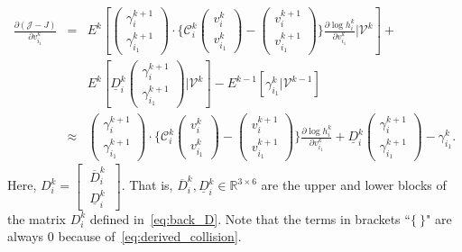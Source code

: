 \documentclass[12pt,nopreprintline]{elsarticle}
\newcommand{\cC}{\mathcal C} \newcommand{\cD}{\mathcal D}
\begin{document}
\begin{eqnarray}
\frac{\partial (\mathcal{J}-J)}{\partial v^k_{i_1}}
&=& E^k\left[ \begin{pmatrix} \gamma_i^{k+1} \\ \gamma_{i_1}^{k+1} \end{pmatrix}  \cdot
\bigg\{  \cC_i^k  \begin{pmatrix}
v_i^{k} \\ v_{i_1}^{k}
\end{pmatrix}  - \begin{pmatrix}
v_i^{k+1} \\ v_{i_1}^{k+1}
\end{pmatrix}  \bigg\} 
   \frac{\partial \log h_i^k}{\partial v_{i_1}^k}  \bigg| \mathcal{V}^k \right] +  \nonumber  \\
&&    E^k \left[  \underline{D}_i^k \begin{pmatrix}
\gamma_i^{k+1} \\ \gamma_{i_1}^{k+1} \end{pmatrix} \bigg | \mathcal{V}^k \right] -  E^{k-1} \left[  \gamma_{i_1}^k  | \mathcal{V}^{k-1}  \right]
\nonumber \\
&\approx& 
\begin{pmatrix} \gamma_i^{k+1} \\ \gamma_{i_1}^{k+1} \end{pmatrix}  \cdot 
\bigg\{  \cC_i^k \begin{pmatrix}
v_i^{k} \\ v_{i_1}^{k}
\end{pmatrix}  - \begin{pmatrix}
v_i^{k+1} \\ v_{i_1}^{k+1}
\end{pmatrix}  \bigg\} 
   \frac{\partial \log h_i^k}{\partial v_{i_1}^k}    
   +      \underline{D}_i^k \begin{pmatrix}
\gamma_i^{k+1} \\ \gamma_{i_1}^{k+1}
\end{pmatrix}  -      \gamma_{i_1}^k. 
\label{eq:J_v1_non_final}
\end{eqnarray}
Here, $D_i^k = \begin{bmatrix}
\ \overline{D}_i^k\  \\ \ \underline{D}_i^k \
\end{bmatrix}$. That is, $\overline{D}_i^k, \underline{D}_i^k \in \mathbb{R}^{3\times 6}$ are the upper and  lower blocks of the matrix $D_i^k$ defined in~\eqref{eq:back_D}. Note that the terms in brackets ``$\{ \ \}$" are always $0$ because of~\eqref{eq:derived_collision}.
\end{document}
